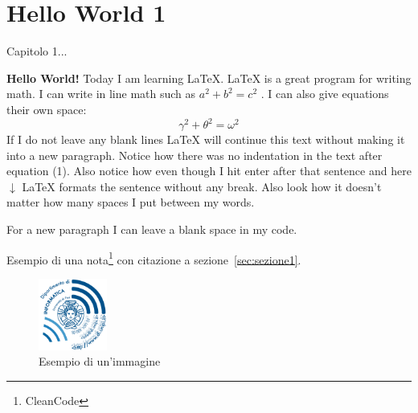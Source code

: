 \chapter{Hello World 1}
\label{ch:capitolo1}


Capitolo 1...


    \textbf{Hello World!} Today I am learning \LaTeX. %
     \LaTeX{} is a great program for writing math. I can write in line math such as $a^2+b^2=c^2$ %
     . I can also give equations their own space:
    \begin{equation} %
    \gamma^2+\theta^2=\omega^2
    \end{equation}
    If I do not leave any blank lines \LaTeX{} will continue  this text without making it into a new paragraph.  Notice how there was no indentation in the text after equation (1).
    Also notice how even though I hit enter after that sentence and here $\downarrow$
     \LaTeX{} formats the sentence without any break.  Also   look  how      it   doesn't     matter          how    many  spaces     I put     between       my    words.

    For a new paragraph I can leave a blank space in my code.

Esempio di una nota\footnote{CleanCode} con citazione a sezione~\ref{sec:sezione1}.

\begin{figure}[H]
    \centering
    \includegraphics[width=0.2\textwidth]{assets/images/logo-dip_blu_hr.png}
    \caption{Esempio di un'immagine}
    \label{fig:immagine1}
\end{figure}

%

